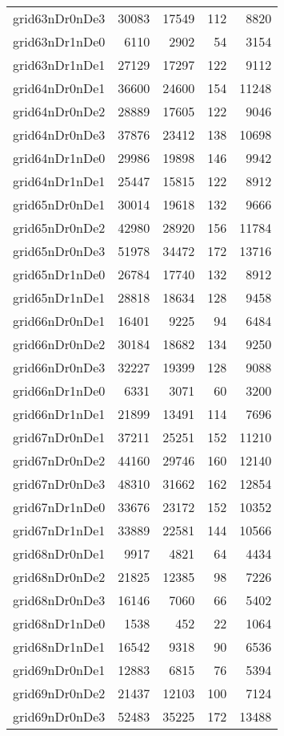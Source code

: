 \begin{longtable}{lrrrr}
grid63nDr0nDe3 & 30083 & 17549 & 112 & 8820 \\
grid63nDr1nDe0 & 6110 & 2902 & 54 & 3154 \\
grid63nDr1nDe1 & 27129 & 17297 & 122 & 9112 \\
grid64nDr0nDe1 & 36600 & 24600 & 154 & 11248 \\
grid64nDr0nDe2 & 28889 & 17605 & 122 & 9046 \\
grid64nDr0nDe3 & 37876 & 23412 & 138 & 10698 \\
grid64nDr1nDe0 & 29986 & 19898 & 146 & 9942 \\
grid64nDr1nDe1 & 25447 & 15815 & 122 & 8912 \\
grid65nDr0nDe1 & 30014 & 19618 & 132 & 9666 \\
grid65nDr0nDe2 & 42980 & 28920 & 156 & 11784 \\
grid65nDr0nDe3 & 51978 & 34472 & 172 & 13716 \\
grid65nDr1nDe0 & 26784 & 17740 & 132 & 8912 \\
grid65nDr1nDe1 & 28818 & 18634 & 128 & 9458 \\
grid66nDr0nDe1 & 16401 & 9225 & 94 & 6484 \\
grid66nDr0nDe2 & 30184 & 18682 & 134 & 9250 \\
grid66nDr0nDe3 & 32227 & 19399 & 128 & 9088 \\
grid66nDr1nDe0 & 6331 & 3071 & 60 & 3200 \\
grid66nDr1nDe1 & 21899 & 13491 & 114 & 7696 \\
grid67nDr0nDe1 & 37211 & 25251 & 152 & 11210 \\
grid67nDr0nDe2 & 44160 & 29746 & 160 & 12140 \\
grid67nDr0nDe3 & 48310 & 31662 & 162 & 12854 \\
grid67nDr1nDe0 & 33676 & 23172 & 152 & 10352 \\
grid67nDr1nDe1 & 33889 & 22581 & 144 & 10566 \\
grid68nDr0nDe1 & 9917 & 4821 & 64 & 4434 \\
grid68nDr0nDe2 & 21825 & 12385 & 98 & 7226 \\
grid68nDr0nDe3 & 16146 & 7060 & 66 & 5402 \\
grid68nDr1nDe0 & 1538 & 452 & 22 & 1064 \\
grid68nDr1nDe1 & 16542 & 9318 & 90 & 6536 \\
grid69nDr0nDe1 & 12883 & 6815 & 76 & 5394 \\
grid69nDr0nDe2 & 21437 & 12103 & 100 & 7124 \\
grid69nDr0nDe3 & 52483 & 35225 & 172 & 13488 \\

\end{longtable}
